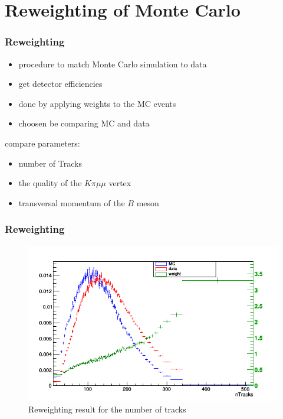 \documentclass{beamer}
\begin{document}

\section{Reweighting of Monte Carlo}

\begin{frame}
  \frametitle{Reweighting}

    \begin{itemize}
      \item procedure to match Monte Carlo simulation to data
      \item get detector efficiencies
      \item done by applying weights to the MC events
      \item choosen be comparing MC and data
    \end{itemize}
compare parameters:
\begin{itemize}
  \item number of Tracks
  \item the quality of the $K \pi \mu \mu$ vertex
  \item transversal momentum of the $B$ meson
\end{itemize}

\end{frame}

\begin{frame}
  \frametitle{Reweighting}

  \begin{figure}
   \includegraphics[width=0.8\linewidth]{figures/nTracksw}
   \caption{Reweighting result for the number of tracks}
  \end{figure}


\end{frame}

\end{document}
